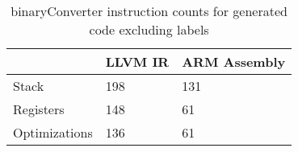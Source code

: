 \begin{table}[h!]
\centering
\begin{tabular}{p{}p{}p{}}
  \hline
 & LLVM IR & ARM Assembly \\ 
  \hline
Stack & 198 & 131 \\ 
  Registers & 148 &  61 \\ 
  Optimizations & 136 &  61 \\ 
   \hline
\end{tabular}
\caption{binaryConverter instruction counts for generated code excluding labels}
\end{table}
